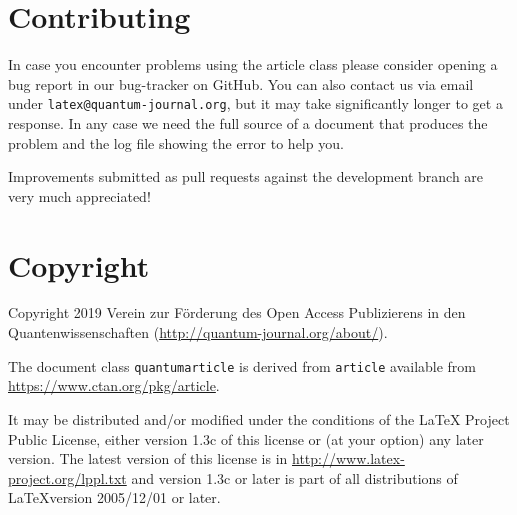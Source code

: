 \documentclass[a4paper,noarxiv,onecolumn]{quantumarticle}
\begin{document}
	\section{Contributing}
	In case you encounter problems using the article class please consider opening a bug report in our bug-tracker on GitHub. You can also contact us via email under \texttt{latex@quantum-journal.org}, but it may take significantly longer to get a response. In any case we need the full source of a document that produces the problem and the log file showing the error to help you.
	
	Improvements submitted as pull requests against the development branch are very much appreciated!
	
	\section{Copyright}
	Copyright 2019 Verein zur Förderung des Open Access Publizierens in den Quantenwissenschaften (\url{http://quantum-journal.org/about/}).
	
	The document class \texttt{quantumarticle} is derived from \texttt{article} available from \url{https://www.ctan.org/pkg/article}.
	
	It may be distributed and/or modified under the conditions of the LaTeX Project Public License, either version 1.3c of this license or (at your option) any later version. The latest version of this license is in \url{http://www.latex-project.org/lppl.txt} and version 1.3c or later is part of all distributions of \LaTeX version 2005/12/01 or later.
\end{document}

